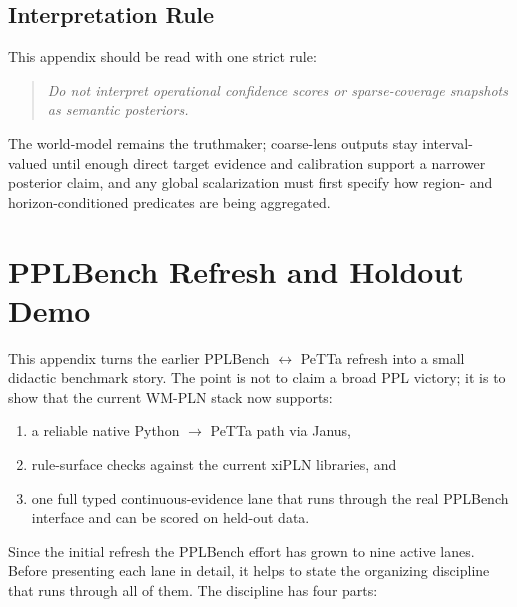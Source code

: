 \documentclass[11pt,openany]{report}
\begin{document}
\section{Interpretation Rule}

This appendix should be read with one strict rule:
\begin{quote}
\emph{Do not interpret operational confidence scores or sparse-coverage
snapshots as semantic posteriors.}
\end{quote}
The world-model remains the truthmaker; coarse-lens outputs stay
interval-valued until enough direct target evidence and calibration
support a narrower posterior claim, and any global scalarization must
first specify how region- and horizon-conditioned predicates are being
aggregated.

\chapter{PPLBench Refresh and Holdout Demo}
\label{app:pplbench-petta-refresh}

This appendix turns the earlier PPLBench $\leftrightarrow$ PeTTa refresh
into a small didactic benchmark story.  The point is not to claim a broad
PPL victory; it is to show that the current WM-PLN stack now supports:
\begin{enumerate}
\item a reliable native Python $\to$ PeTTa path via Janus,
\item rule-surface checks against the current xiPLN libraries, and
\item one full typed continuous-evidence lane that runs through the real
PPLBench interface and can be scored on held-out data.
\end{enumerate}

\noindent
Since the initial refresh the PPLBench effort has grown to nine active lanes.
Before presenting each lane in detail, it helps to state the organizing
discipline that runs through all of them.  The discipline has four parts:
\end{document}
